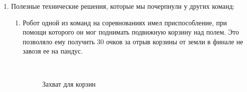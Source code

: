 \begin{enumerate}
	\item Полезные технические решения, которые мы почерпнули у других команд:
	\begin{enumerate}
		\item Робот одной из команд на соревнованиях имел приспособление, при помощи которого он мог поднимать подвижную корзину над полем. Это позволяло ему получить 30 очков за отрыв корзины от земли в финале не завозя ее на пандус.
		\begin{figure}[H]
			\begin{minipage}[h]{0.2\linewidth}
				\center  
			\end{minipage}
			\begin{minipage}[h]{0.6\linewidth}
				\caption{Захват для корзин}
			\end{minipage}
		\end{figure}
		

\end{enumerate}
\end{enumerate}

